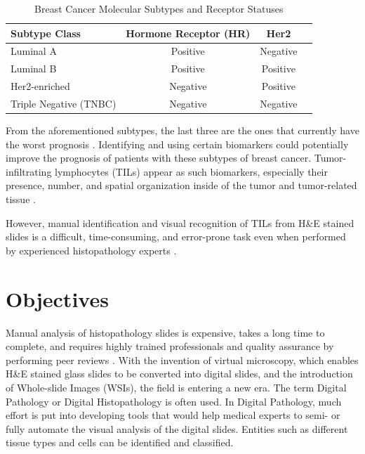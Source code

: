 \begin{table}[H]
 \centering
 \caption{Breast Cancer Molecular Subtypes and Receptor Statuses}
 \label{tab:breast_cancer_subtypes}
 \begin{tabular}{|l|c|c|c|}
 \hline
 \textbf{Subtype Class} & \textbf{Hormone Receptor (HR)} & \textbf{Her2} \\
 \hline
 Luminal A & Positive & Negative \\
 \hline
 Luminal B & Positive & Positive \\
 \hline
 Her2-enriched & Negative & Positive \\
 \hline
 Triple Negative (TNBC) & Negative & Negative \\
 \hline
 \end{tabular}
\end{table}

From the aforementioned subtypes, the last three are the ones that currently have the worst prognosis \cite{Schalper2022, Zhang2024}. Identifying and using certain biomarkers could potentially improve the prognosis of patients with these subtypes of breast cancer. Tumor-infiltrating lymphocytes (TILs) appear as such biomarkers, especially their presence, number, and spatial organization inside of the tumor and tumor-related tissue \cite{Salgado2015, Denkert2018, Amgad2019}.

However, manual identification and visual recognition of TILs from H\&E stained slides is a difficult, time-consuming, and error-prone task even when performed by experienced histopathology experts \cite{Salgado2015, Amgad2019}.

\section{Objectives}
Manual analysis of histopathology slides is expensive, takes a long time to complete, and requires highly trained professionals and quality assurance by performing peer reviews \cite{Wemmert2021}. With the invention of virtual microscopy, which enables H\&E stained glass slides to be converted into digital slides, and the introduction of Whole-slide Images (WSIs), the field is entering a new era. The term Digital Pathology or Digital Histopathology is often used. In Digital Pathology, much effort is put into developing tools that would help medical experts to semi- or fully automate the visual analysis of the digital slides. Entities such as different tissue types and cells can be identified and classified.

